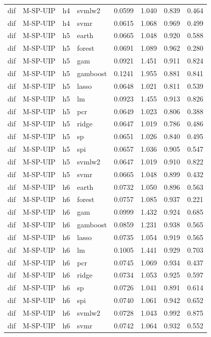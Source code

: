 \begin{ThreePartTable}
\begin{longtable}[t]{llclcccc}
dif & M-SP-UIP & h4 & svmlw2 & 0.0599 & 1.040 & 0.839 & 0.464\\
dif & M-SP-UIP & h4 & svmr & 0.0615 & 1.068 & 0.969 & 0.499\\
\addlinespace
dif & M-SP-UIP & h5 & earth & 0.0665 & 1.048 & 0.920 & 0.588\\
dif & M-SP-UIP & h5 & forest & 0.0691 & 1.089 & 0.962 & 0.280\\
dif & M-SP-UIP & h5 & gam & 0.0921 & 1.451 & 0.911 & 0.824\\
dif & M-SP-UIP & h5 & gamboost & 0.1241 & 1.955 & 0.881 & 0.841\\
dif & M-SP-UIP & h5 & lasso & 0.0648 & 1.021 & 0.811 & 0.539\\
dif & M-SP-UIP & h5 & lm & 0.0923 & 1.455 & 0.913 & 0.826\\
dif & M-SP-UIP & h5 & pcr & 0.0649 & 1.023 & 0.806 & 0.388\\
dif & M-SP-UIP & h5 & ridge & 0.0647 & 1.019 & 0.786 & 0.486\\
dif & M-SP-UIP & h5 & sp & 0.0651 & 1.026 & 0.840 & 0.495\\
dif & M-SP-UIP & h5 & spi & 0.0657 & 1.036 & 0.905 & 0.547\\
dif & M-SP-UIP & h5 & svmlw2 & 0.0647 & 1.019 & 0.910 & 0.822\\
dif & M-SP-UIP & h5 & svmr & 0.0665 & 1.048 & 0.899 & 0.432\\
\addlinespace
dif & M-SP-UIP & h6 & earth & 0.0732 & 1.050 & 0.896 & 0.563\\
dif & M-SP-UIP & h6 & forest & 0.0757 & 1.085 & 0.937 & 0.221\\
dif & M-SP-UIP & h6 & gam & 0.0999 & 1.432 & 0.924 & 0.685\\
dif & M-SP-UIP & h6 & gamboost & 0.0859 & 1.231 & 0.938 & 0.565\\
dif & M-SP-UIP & h6 & lasso & 0.0735 & 1.054 & 0.919 & 0.565\\
dif & M-SP-UIP & h6 & lm & 0.1005 & 1.441 & 0.929 & 0.703\\
dif & M-SP-UIP & h6 & pcr & 0.0745 & 1.069 & 0.934 & 0.437\\
dif & M-SP-UIP & h6 & ridge & 0.0734 & 1.053 & 0.925 & 0.597\\
dif & M-SP-UIP & h6 & sp & 0.0726 & 1.041 & 0.891 & 0.614\\
dif & M-SP-UIP & h6 & spi & 0.0740 & 1.061 & 0.942 & 0.652\\
dif & M-SP-UIP & h6 & svmlw2 & 0.0728 & 1.043 & 0.992 & 0.875\\
dif & M-SP-UIP & h6 & svmr & 0.0742 & 1.064 & 0.932 & 0.552\\

\end{longtable}
\end{ThreePartTable}
